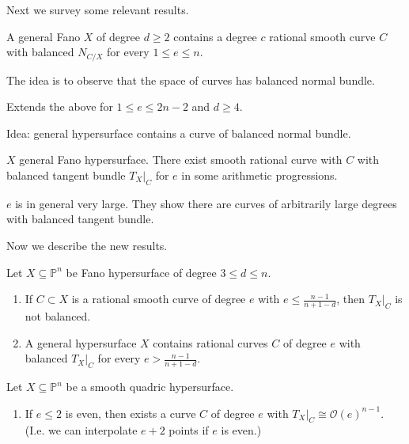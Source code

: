 {\medskip\noindent
Next we survey some relevant results.

\begin{theorem}
\label{theorem-CR18}
A general Fano $X$ of degree $d \geq 2$ 
contains a degree $c$ rational smooth curve
 $C$ with balanced $N_{C/X}$ 
for every $1 \leq e \leq  n$.
\end{theorem}

The idea is to observe that the space of curves has
balanced normal bundle.

\begin{theorem}[Ran, 2021]
\label{theorem-R21}
Extends the above for
$1 \leq  e \leq 2n-2$ 
and $d \geq 4$.
\end{theorem}

Idea: general hypersurface contains a curve of balanced normal bundle.

\begin{theorem}[Ran, 2024]
\label{theorem-R24}
$X$ general Fano hypersurface.
There exist smooth rational curve with  $C$ 
with balanced tangent bundle $T_{X}|_{C}$ 
for $e$ in some arithmetic progressions.
\end{theorem}

$e$ is in general very large.
They show there are curves of arbitrarily large
degrees with balanced tangent bundle.

\medskip\noindent
Now we describe the new results.

\begin{theorem}
\label{theorem-Lucas}
Let $X \subseteq \mathbb{P}^n$ be Fano
hypersurface of degree $3 \leq d \leq n$.

\begin{enumerate}
\item If $C \subset X$ is a rational smooth curve
of degree $e$ with 
$e \leq  \frac{n-1}{n+1-d}$,
then $T_X|_{C}$ is not balanced.

\item A general hypersurface $X$ 
contains rational curves $C$ 
of degree $e$ with balanced
$T_X|_{C}$ for every
$e> \frac{n-1}{n+1-d}$.
\end{enumerate}

\begin{theorem}
\label{theorem-lucas2}
Let $X \subseteq \mathbb{P}^n$ be a smooth quadric hypersurface.

\begin{enumerate}
\item If $e \leq 2$ is even,
then exists a curve $C$ of degree $e$ 
with $T_X|_{C}\cong \mathcal{O}(e)^{n-1}$.
(I.e. we can interpolate $e+2$ points
if $e$ is even.)


\end{enumerate}
\end{theorem}
\end{theorem}}
